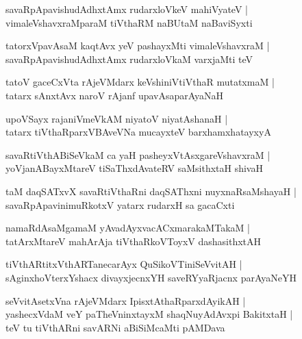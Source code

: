 \documentclass[twoside,12pt,openright]{book}
\newcounter{shloka}[chapter]
\begin{document}
\begin{shloka}
savaRpApavishudAdhxtAmx rudarxloVkeV mahiVyateV |\\
vimaleVshavxraMparaM tiVthaRM naBUtaM naBaviSyxti
\end{shloka}

\begin{shloka}
tatorxVpavAsaM kaqtAvx yeV pashayxMti vimaleVshavxraM |\\
savaRpApavishudAdhxtAmx rudarxloVkaM varxjaMti teV 
\end{shloka}

\begin{shloka}
tatoV gaceCxVta rAjeVMdarx keVshiniVtiVthaR mutatxmaM |\\
tatarx sAnxtAvx naroV rAjanf upavAsaparAyaNaH 
\end{shloka}

\begin{shloka}
upoVSayx rajaniVmeVkAM niyatoV niyatAshanaH |\\
tatarx tiVthaRparxVBAveVNa mucayxteV barxhamxhatayxyA 
\end{shloka}

\begin{shloka}
savaRtiVthABiSeVkaM ca yaH pasheyxVtAsxgareVshavxraM |\\
yoVjanABayxMtareV tiSaThxdAvateRV saMsithxtaH shivaH 
\end{shloka}

\begin{shloka}
taM daqSATxvX savaRtiVthaRni daqSAThxni nuyxnaRsaMshayaH |\\
savaRpApavinimuRkotxV yatarx rudarxH sa gacaCxti 
\end{shloka}

\begin{shloka}
namaRdAsaMgamaM yAvadAyxvacACxmarakaMTakaM |\\
tatArxMtareV mahArAja tiVthaRkoVToyxV dashasithxtAH 
\end{shloka}

\begin{shloka}
tiVthARtitxVthARTanecarAyx QuSikoVTiniSeVvitAH |\\
sAginxhoVterxYshacx divayxjecnxYH saveRYyaRjacnx parAyaNeYH 
\end{shloka}

\begin{shloka}
seVvitAsetxVna rAjeVMdarx IpisxtAthaRparxdAyikAH |\\
yashecxVdaM veY paTheVninxtayxM shaqNuyAdAvxpi BakitxtaH |\\
teV tu tiVthARni savARNi aBiSiMcaMti pAMDava
\end{shloka}
\end{document}
